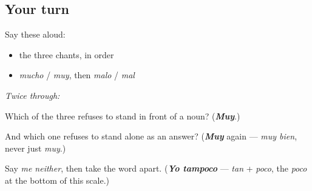 \subsection*{Your turn}
Say these aloud:

\begin{itemize}
\raggedright
  \item the three chants, in order
  \item \emph{mucho} / \emph{muy}, then \emph{malo} / \emph{mal}
\end{itemize}

\emph{Twice through:}

\begin{tcolorbox}[breakable,colback=teal!4,colframe=teal!35!black,title={Before you move on}]
Which of the three refuses to stand in front of a noun? (\emph{\textbf{Muy}}.)

And which one refuses to stand alone as an answer? (\emph{\textbf{Muy}} again — \emph{muy bien}, never just \emph{muy}.)

Say \emph{me neither}, then take the word apart. (\emph{\textbf{Yo tampoco}} — \emph{tan} + \emph{poco}, the \emph{poco} at the bottom of this scale.)
\end{tcolorbox}
